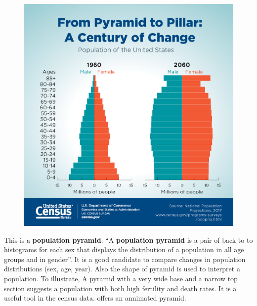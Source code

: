 \documentclass[]{book}
\theoremstyle{definition}
\theoremstyle{definition}
\theoremstyle{definition}
\theoremstyle{remark}
\begin{document}
\citep{population_pyramid}

\begin{figure}
\centering
\includegraphics{images/Pyramid.jpg}
\caption{}
\end{figure}

This is a \textbf{population pyramid}. ``A \textbf{population pyramid}
is a pair of back-to to histograms for each sex that displays the
distribution of a population in all age groups and in gender''. It is a
good candidate to compare changes in population distributions (sex, age,
year). Also the shape of pyramid is used to interpret a population. To
illustrate, A pyramid with a very wide base and a narrow top section
suggests a population with both high fertility and death rates. It is a
useful tool in the census data. \citep{animated_pyramid} offers an
annimated pyramid.
\end{document}
